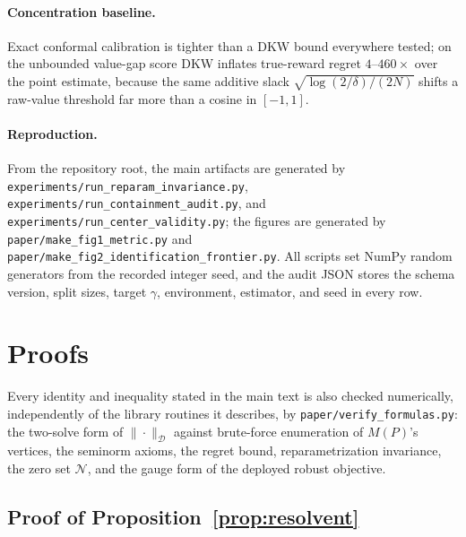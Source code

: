 \documentclass{article}
\newcommand{\Dnorm}[1]{\|#1\|_{\mathcal D}}
\begin{document}
\paragraph{Concentration baseline.} Exact conformal calibration is tighter than
a DKW bound everywhere tested; on the unbounded value-gap score DKW inflates
true-reward regret $4$--$460\times$ over the point estimate, because the same
additive slack $\sqrt{\log(2/\delta)/(2N)}$ shifts a raw-value threshold far
more than a cosine in $[-1,1]$.

\paragraph{Reproduction.} From the repository root, the main artifacts are
generated by \texttt{experiments/run\_reparam\_invariance.py},
\texttt{experiments/run\_containment\_audit.py}, and
\texttt{experiments/run\_center\_validity.py}; the figures are generated by
\texttt{paper/make\_fig1\_metric.py} and
\texttt{paper/make\_fig2\_identification\_frontier.py}. All scripts set NumPy
random generators from the recorded integer seed, and the audit JSON stores the
schema version, split sizes, target $\gamma$, environment, estimator, and seed
in every row.

\section{Proofs}
\label{app:proofs}

Every identity and inequality stated in the main text is also checked
numerically, independently of the library routines it describes, by
\texttt{paper/verify\_formulas.py}: the two-solve form of $\Dnorm{\cdot}$
against brute-force enumeration of $M(P)$'s vertices, the seminorm axioms, the
regret bound, reparametrization invariance, the zero set $\mathcal N$, and the
gauge form of the deployed robust objective.

\subsection{Proof of Proposition~\ref{prop:resolvent}}
\label{app:proof-resolvent}
\end{document}
